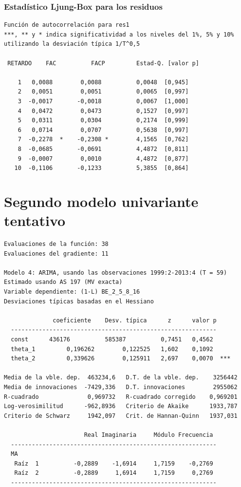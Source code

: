 \documentclass[10pt]{article}
\begin{document}
\subsubsection*{Estadístico Ljung-Box para los residuos}
\label{sec:org5303992}

\begin{verbatim}
Función de autocorrelación para res1
***, ** y * indica significatividad a los niveles del 1%, 5% y 10%
utilizando la desviación típica 1/T^0,5

 RETARDO    FAC          FACP         Estad-Q. [valor p]

    1   0,0088        0,0088          0,0048  [0,945]
    2   0,0051        0,0051          0,0065  [0,997]
    3  -0,0017       -0,0018          0,0067  [1,000]
    4   0,0472        0,0473          0,1527  [0,997]
    5   0,0311        0,0304          0,2174  [0,999]
    6   0,0714        0,0707          0,5638  [0,997]
    7  -0,2278  *    -0,2308 *        4,1565  [0,762]
    8  -0,0685       -0,0691          4,4872  [0,811]
    9  -0,0007        0,0010          4,4872  [0,877]
   10  -0,1106       -0,1233          5,3855  [0,864]
\end{verbatim}
\section*{Segundo modelo univariante tentativo}
\label{sec:orgb6a76d6}

\begin{verbatim}
Evaluaciones de la función: 38
Evaluaciones del gradiente: 11

Modelo 4: ARIMA, usando las observaciones 1999:2-2013:4 (T = 59)
Estimado usando AS 197 (MV exacta)
Variable dependiente: (1-L) BE_2_5_8_16
Desviaciones típicas basadas en el Hessiano

              coeficiente    Desv. típica      z      valor p
  -----------------------------------------------------------
  const      436176          585387          0,7451   0,4562 
  theta_1         0,196262        0,122525   1,602    0,1092 
  theta_2         0,339626        0,125911   2,697    0,0070  ***

Media de la vble. dep.  463234,6   D.T. de la vble. dep.    3256442
Media de innovaciones  -7429,336   D.T. innovaciones        2955062
R-cuadrado              0,969732   R-cuadrado corregido    0,969201
Log-verosimilitud      -962,8936   Criterio de Akaike      1933,787
Criterio de Schwarz     1942,097   Crit. de Hannan-Quinn   1937,031

                       Real Imaginaria     Módulo Frecuencia
  -----------------------------------------------------------
  MA
   Raíz  1          -0,2889    -1,6914     1,7159    -0,2769
   Raíz  2          -0,2889     1,6914     1,7159     0,2769
  -----------------------------------------------------------
\end{verbatim}
\end{document}
